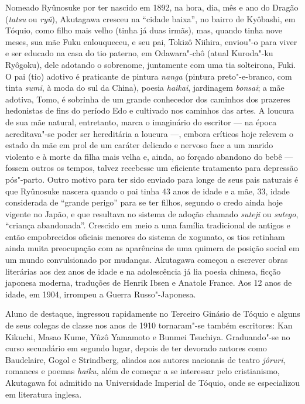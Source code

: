 Nomeado  Ryûnosuke por ter nascido em 1892, na hora, dia, mês e ano do
Dragão (\textit{tatsu} ou \textit{ryû}), Akutagawa cresceu na ``cidade
baixa'', no bairro de Kyôbashi, em Tóquio, como filho mais velho
(tinha já duas irmãs), mas, quando tinha nove meses, sua mãe Fuku
enlouqueceu, e seu pai, Tokizô Niihira, enviou"-o para viver e ser
educado na casa do tio paterno, em Odawara"-chô (atual Kuroda"-ku
Ryôgoku), dele adotando o sobrenome, juntamente com uma tia solteirona,
Fuki. O pai (tio) adotivo é praticante de pintura \textit{nanga} 
(pintura preto"-e-branco, com tinta \textit{sumi}, à moda do 
sul da China), poesia \textit{haikai}, jardinagem \textit{bonsai}; a
mãe adotiva, Tomo, é sobrinha de um grande conhecedor dos caminhos dos
prazeres hedonistas de fins do período Edo e cultivado nos caminhos das
artes. A loucura de sua mãe natural, entretanto, marca o imaginário do
escritor --- na época acreditava"-se poder ser hereditária a loucura ---,
embora críticos hoje relevem o estado da mãe em prol de um caráter
delicado e nervoso  face a um marido violento e à morte da filha mais
velha e, ainda, ao forçado abandono do bebê --- fossem outros os tempos,
talvez recebesse um eficiente tratamento para depressão pós"-parto.
Outro motivo para ter sido enviado para longe de seus pais naturais é
que Ryûnosuke nascera quando o pai tinha 43 anos de idade e a mãe, 33,
idade considerada de ``grande perigo'' para se ter filhos, segundo o credo 
ainda hoje vigente no Japão, e que resultava no sistema de adoção chamado \textit{suteji} ou
\textit{sutego}, ``criança abandonada''. Crescido em meio a uma família
tradicional de antigos e então empobrecidos oficiais menores do sistema
de xogunato, os tios retinham ainda muita preocupação com as aparências de
uma quimera de posição social em um mundo convulsionado por mudanças.
Akutagawa começou a escrever obras literárias aos dez anos de idade e na
adolescência já lia poesia chinesa, ficção japonesa moderna, traduções
de Henrik Ibsen e Anatole France. Aos 12 anos de idade, em 1904,
irrompeu a Guerra Russo"-Japonesa.

Aluno de destaque, ingressou rapidamente no Terceiro Ginásio de Tóquio e 
alguns de seus colegas de classe nos anos de 1910 tornaram"-se
também escritores: Kan Kikuchi, Masao Kume, Yûzô Yamamoto e Bunmei Tsuchiya. 
Graduando"-se no curso secundário em segundo lugar, depois de
ter devorado autores como Baudelaire, Gogol e Strindberg, aliados aos
autores nacionais de teatro \textit{jôruri}, romances e poemas
\textit{haiku}, além de começar a se interessar pelo cristianismo,
Akutagawa foi admitido na Universidade Imperial de Tóquio, onde se
especializou em literatura inglesa.


